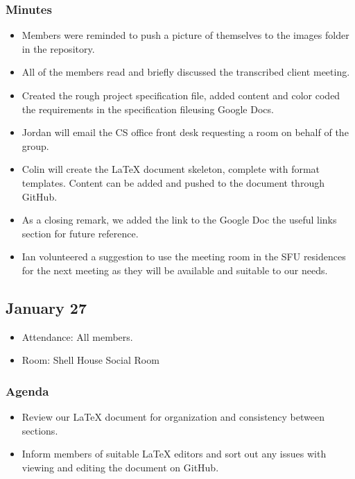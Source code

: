 \documentclass{article}
\begin{document}
\subsubsection{Minutes}
\begin{itemize}
\item Members were reminded to push a picture of themselves to the images folder in the repository.
\item All of the members read and briefly discussed the transcribed client meeting.
\item Created the rough project specification file, added content and color coded the requirements in the specification file{using Google Docs}.
\item Jordan will email the CS office front desk requesting a room on behalf of the group.
\item Colin will create the LaTeX document skeleton, complete with format templates. Content can be added and pushed to the document through GitHub.
\item As a closing remark, we added the link to the Google Doc the useful links section for future reference. 
\item Ian volunteered a suggestion to use the meeting room in the SFU residences for the next meeting as they will be available and suitable to our needs.
\end{itemize}

\subsection{January 27}
\begin{itemize}
\item Attendance: All members.
\item Room: Shell House Social Room
\end{itemize}
\subsubsection{Agenda}
\begin{itemize}
\item Review our LaTeX document for organization and consistency between sections.
\item Inform members of suitable LaTeX editors and sort out any issues with viewing and editing the document on GitHub.
\end{itemize}
\end{document}
